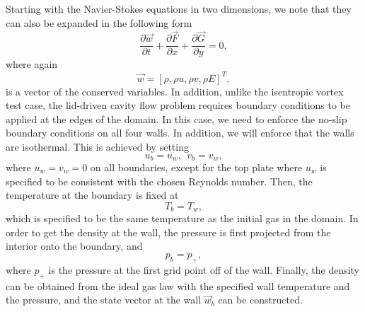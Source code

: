 Starting with the Navier-Stokes equations in two dimensions, we note that they can also be expanded in the following form
\begin{equation}
	\label{eqn:5js81pgl}
	\frac{\partial \vec{w}}{\partial t} + \frac{\partial{\vec{F}}}{\partial x} + \frac{\partial{\vec{G}}}{\partial y} = 0,
\end{equation}
where again
\begin{equation}
	\vec{w} = [\rho,\rho u, \rho v, \rho E]^T,
\end{equation}
is a vector of the conserved variables. In addition, unlike the isentropic vortex test case, the lid-driven cavity flow problem requires boundary conditions to be applied at the edges of the domain. In this case, we need to enforce the no-slip boundary conditions on all four walls. In addition, we will enforce that the walls are isothermal. This is achieved by setting
\begin{equation}
	u_b = u_w, \: \:
	v_b = v_w,
\end{equation}
where $u_w = v_w = 0$ on all boundaries, except for the top plate where $u_w$ is specified to be consistent with the chosen Reynolds number. Then, the temperature at the boundary is fixed at
\begin{equation}
	T_b = T_w,
\end{equation}
which is specified to be the same temperature as the initial gas in the domain. In order to get the density at the wall, the pressure is first projected from the interior onto the boundary, and 
\begin{equation}
	p_b = p_+,
\end{equation}
where $p_+$ is the pressure at the first grid point off of the wall. Finally, the density can be obtained from the ideal gas law with the specified wall temperature and the pressure, and the state vector at the wall $\vec{w}_b$ can be constructed.

